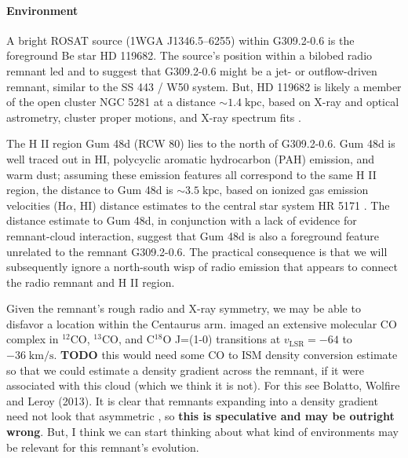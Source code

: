 \documentclass[preprint2,tighten,trackchanges]{aastex6}
\newcommand*{\mt}{\mathrm}
\newcommand*{\unit}[1]{\;\mt{#1}}  %
\newcommand*{\abt}{\mathord{\sim}} %
\newcommand*{\nH}{N_{\mathrm{H}}}
\begin{document}
\paragraph{Environment}

A bright ROSAT source (1WGA J1346.5--6255) within G309.2-0.6 is the foreground
Be star HD 119682.
The source's position within a bilobed radio remnant led
 and  to suggest that
G309.2-0.6 might be a jet- or outflow-driven remnant, similar to the SS 443 /
W50 system.
But, HD 119682 is likely a member of the open cluster NGC 5281 at a distance
$\abt 1.4 \unit{kpc}$, based on X-ray and optical astrometry, cluster proper
motions, and X-ray spectrum fits \citep{rakowski2006, safi-harb2007,
torrejon2013}.

The H II region Gum 48d (RCW 80) lies to the north of G309.2-0.6.
Gum 48d is well traced out in HI, polycyclic aromatic hydrocarbon (PAH)
emission, and warm dust; assuming these emission features all correspond to the
same H II region, the distance to Gum 48d is $\abt 3.5\unit{kpc}$, based on
ionized gas emission velocities (H$\alpha$, HI) distance estimates to the
central star system HR 5171 \citep{karr2009}.
The distance estimate to Gum 48d, in conjunction with a lack of evidence for
remnant-cloud interaction, suggest that Gum 48d is also a foreground feature
unrelated to the remnant G309.2-0.6.  The practical consequence is that we will
subsequently ignore a north-south wisp of radio emission that appears to
connect the radio remnant and H II region.

Given the remnant's rough radio and X-ray symmetry, we may be able to disfavor
a location within the Centaurus arm.  \citet{saito2001} imaged
an extensive molecular CO complex in ${}^{12}$CO, ${}^{13}$CO, and C${}^{18}$O
J=(1-0) transitions at $v_\mt{LSR} = -64$ to $-36 \unit{km/s}$.
\textbf{TODO} this would need some CO to ISM density conversion estimate so
that we could estimate a density gradient across the remnant, if it were
associated with this cloud (which we think it is not).
For this see Bolatto, Wolfire and Leroy (2013).
It is clear that remnants expanding into a density gradient need not look that
asymmetric \citep{williams2013}, so \textbf{this is speculative and may be
outright wrong}.
But, I think we can start thinking about what kind of environments may be
relevant for this remnant's evolution.
%
\end{document}
